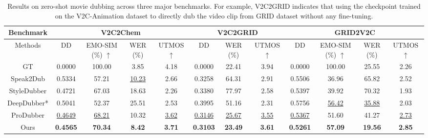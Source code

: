 \begin{table}[!t]
  \centering

  \resizebox{1.0\linewidth}{!}
  {

    \begin{tabular}{c|cccc|ccc|cccc}
    \hline
    
    Benchmark & \multicolumn{4}{c|}{V2C2Chem} & \multicolumn{3}{c|}{V2C2GRID} & \multicolumn{4}{c}{GRID2V2C} \\
    \midrule
    Methods 
    & DD  
    & \small{EMO-SIM} (\%) $\uparrow$
    & WER (\%) 
    & \small{UTMOS} $\uparrow$   
    & DD  
    & WER (\%) 
    & \small{UTMOS} $\uparrow$   
    & DD  
    & \small{EMO-SIM} (\%) $\uparrow$
    & WER (\%) 
    & \small{UTMOS} $\uparrow$     \\
    \midrule
    GT  & 0.0000 & 100.00 & 3.85 & 4.18 & 0.0000 & 22.41 & 3.94 & 0.0000 & 100.00 & 25.55 & 2.26\\
    \midrule
    Speak2Dub & 0.5334 & 57.21 & \underline{10.23} & 2.66 & 0.3258 & 64.31 & 2.91 & 0.5506 & 36.96 & 65.82 & 2.52 \\
    StyleDubber & 0.4721 & 67.03 & 18.63 & 2.26 & 0.3380 & 77.97 & 2.58 & 0.5397 & 39.92 & 70.32 & 1.93 \\
    DeepDubber* & 0.5041 & 52.37 & 25.51 & 2.53 & 0.3995 & 51.16 & 2.31 & 0.5756 & \underline{56.42} & \underline{35.88} & 2.03 \\
    ProDubber & \underline{0.4649} & \underline{68.21} & 10.32 & \underline{3.62} & \underline{0.3146} & \underline{25.67} & \underline{3.55} & \underline{0.5367} & 51.60 & 41.27 & \underline{2.73} \\
    \midrule
    Ours & \textbf{0.4565} & \textbf{70.34} & \textbf{8.42} & \textbf{3.71} & \textbf{0.3103} & \textbf{23.49} & \textbf{3.61} & \textbf{0.5261} & \textbf{57.09} & \textbf{19.56} & \textbf{2.85} \\
    \bottomrule
    \end{tabular}
    }
\caption{
  Results on zero-shot movie dubbing across three major benchmarks. 
  For example, V2C2GRID indicates that using the checkpoint trained on the V2C-Animation dataset to directly dub the video clip from GRID dataset without any fine-tuning.
}
\end{table}
